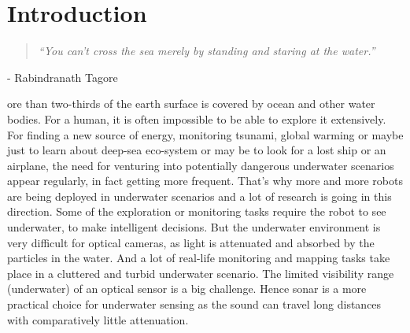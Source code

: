 
\chapter{Introduction}
\label{chap:intro}
\newcommand{\chapquote}[3]{\begin{quotation} \textit{#1} \end{quotation} \begin{flushright} - #2\end{flushright} }

\chapquote{``You can't cross the sea merely by standing and staring at the water.''}{Rabindranath Tagore}



More than two-thirds of the earth surface is covered by ocean and other water bodies. For a human, it is often impossible to be able to explore it extensively. 
For finding a new source of energy, monitoring tsunami, global warming or maybe just to learn about deep-sea eco-system or may be to look for a lost ship or an airplane, the need for venturing into potentially dangerous underwater scenarios appear regularly, in fact getting more frequent. That's why more and more robots are being deployed in underwater scenarios and a lot of research is going in this direction.
Some of the exploration or monitoring tasks require the robot to see underwater, to make intelligent decisions.
But the underwater environment is very difficult for optical cameras, as light is attenuated and absorbed by the particles in the water. And a lot of real-life monitoring and mapping tasks take place in a cluttered and turbid underwater scenario. The limited visibility range (underwater) of an optical sensor is a big challenge. Hence sonar is a more practical choice for underwater sensing as the sound can travel 
long distances with comparatively little attenuation.

